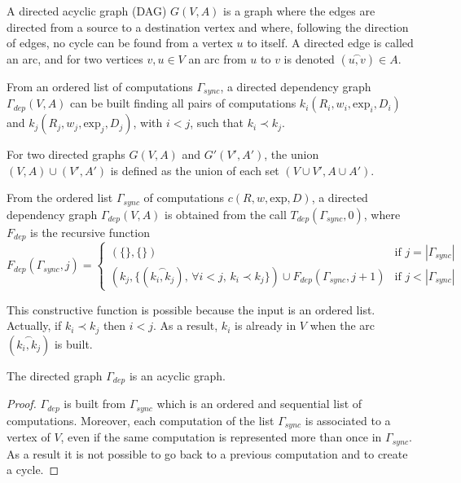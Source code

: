 \begin{mydef}
A directed acyclic graph (DAG) $G(V,A)$ is a graph where the edges are directed from a source to a destination vertex and where, following the direction of edges, no cycle can be found from a vertex $u$ to itself. A directed edge is called an arc, and for two vertices $v,u \in V$ an arc from $u$ to $v$ is denoted $(\overset{\frown}{u,v}) \in A$.
\end{mydef}

From an ordered list of computations $\Gamma_{sync}$, a directed dependency graph $\Gamma_{dep}(V,A)$ can be built finding all pairs of computations $k_i(R_i,w_i,\text{exp}_i,D_i)$ and $k_j(R_j,w_j,\text{exp}_j,D_j)$, with $i<j$, such that $k_i \prec k_j$. %

\begin{mydef}
For two directed graphs $G(V,A)$ and $G'(V',A')$, the union $(V,A)\cup (V',A')$ is defined as the union of each set $(V\cup V', A \cup A')$.
\end{mydef}

\begin{mydef}
From the ordered list $\Gamma_{sync}$ of computations $c(R,w,\text{exp},D)$, a directed dependency graph $\Gamma_{dep}(V,A)$ is obtained from the call $T_{dep}(\Gamma_{sync},0)$, where $F_{dep}$ is the recursive function
\begin{equation*}
F_{dep}(\Gamma_{sync},j) = 
\begin{cases} 	(\{\},\{\}) & \mbox{if }j=|\Gamma_{sync}|\\
				(k_j, \{(\overset{\frown}{k_i,k_j})\mbox{, }\forall i < j \mbox{, } k_i\prec k_j \})\cup F_{dep}(\Gamma_{sync},j+1) & \mbox{if }j<|\Gamma_{sync}|
\end{cases}
\end{equation*}
\end{mydef}

This constructive function is possible because the input is an ordered list. Actually, if $k_i\prec k_j$ then $i<j$. As a result, $k_i$ is already in $V$ when the arc $(\overset{\frown}{k_i,k_j})$ is built. 

\begin{myprop}
The directed graph $\Gamma_{dep}$ is an acyclic graph.
\end{myprop}

\begin{proof}
$\Gamma_{dep}$ is built from $\Gamma_{sync}$ which is an ordered and sequential list of computations. Moreover, each computation of the list $\Gamma_{sync}$ is associated to a vertex of $V$, even if the same computation is represented more than once in $\Gamma_{sync}$. As a result it is not possible to go back to a previous computation and to create a cycle.
\end{proof}

